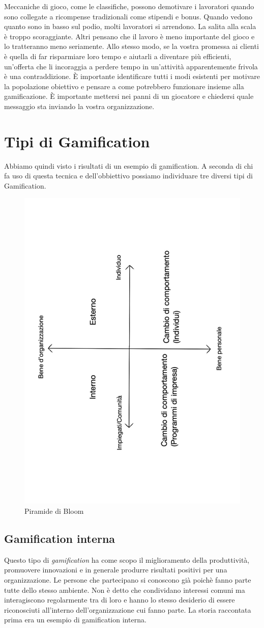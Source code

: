 \begin{itemize}
  Meccaniche di gioco, come le classifiche, possono demotivare i lavoratori quando sono collegate a ricompense tradizionali come stipendi e bonus. Quando vedono quanto sono in basso sul podio, molti lavoratori si arrendono.
La salita alla scala è troppo scoraggiante. Altri pensano che il lavoro è meno importante del gioco e lo tratteranno meno seriamente. Allo stesso modo, se la vostra promessa ai clienti è quella di far risparmiare loro tempo e aiutarli a diventare più efficienti, un'offerta che li incoraggia a perdere tempo in un'attività apparentemente frivola è una contraddizione.
È importante identificare tutti i modi esistenti per motivare la popolazione obiettivo e pensare a come potrebbero funzionare insieme alla gamificazione. È importante mettersi nei panni di un giocatore e chiedersi quale messaggio sta inviando la vostra organizzazione.
\end{itemize}

\section{Tipi di Gamification}
Abbiamo quindi visto i risultati di un esempio di gamification. A seconda di chi fa uso di questa tecnica e dell'obbiettivo possiamo individuare tre diversi tipi di Gamification.
\begin{figure}[h!]
  \centerline{\includegraphics[height = 9 cm, width= 6 cm, angle=270]{figures/assi.pdf}}
  \caption{Piramide di Bloom}
\end{figure}
\subsection{Gamification interna}
Questo tipo di \textit{gamification} ha come scopo il miglioramento della produttività, promuovere innovazioni e in generale produrre risultati positivi per una organizzazione. Le persone che partecipano si conoscono già poichè fanno parte tutte dello stesso ambiente. Non è detto che condividano interessi comuni ma interagiscono regolarmente tra di loro e hanno lo stesso desiderio di essere riconosciuti all'interno dell'organizzazione cui fanno parte. La storia raccontata prima era un esempio di gamification interna.
